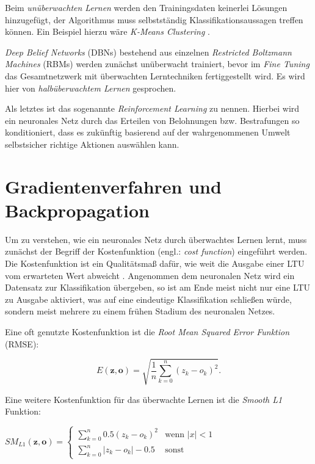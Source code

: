 Beim \textit{unüberwachten Lernen} werden den Trainingsdaten keinerlei Lösungen hinzugefügt, der Algorithmus muss selbstständig Klassifikationsaussagen treffen können. Ein Beispiel hierzu wäre \textit{K-Means Clustering} \cite{AurelienGeron.2018}. 

\textit{Deep Belief Networks} (DBNs) bestehend aus einzelnen \textit{Restricted Boltzmann Machines} (RBMs) werden zunächst unüberwacht trainiert, bevor im \textit{Fine Tuning} das Gesamtnetzwerk mit überwachten Lerntechniken fertiggestellt wird. Es wird hier von \textit{halbüberwachtem Lernen} gesprochen.

Als letztes ist das sogenannte \textit{Reinforcement Learning} zu nennen. Hierbei wird ein neuronales Netz durch das Erteilen von Belohnungen bzw. Bestrafungen so konditioniert, dass es zukünftig basierend auf der wahrgenommenen Umwelt selbstsicher richtige Aktionen auswählen kann.

\section*{Gradientenverfahren und Backpropagation}

Um zu verstehen, wie ein neuronales Netz durch überwachtes Lernen \glqq lernt\grqq{}, muss zunächst der Begriff der Kostenfunktion (engl.: \textit{cost function}) eingeführt werden. Die Kostenfunktion ist ein Qualitätsmaß dafür, wie weit die Ausgabe einer LTU vom erwarteten Wert abweicht \cite{AurelienGeron.2018}. Angenommen dem neuronalen Netz wird ein Datensatz zur Klassifikation übergeben, so ist am Ende meist nicht nur eine LTU zu Ausgabe aktiviert, was auf eine eindeutige Klassifikation schließen würde, sondern meist mehrere zu einem frühen Stadium des neuronalen Netzes.

Eine oft genutzte Kostenfunktion ist die \textit{Root Mean Squared Error Funktion} (RMSE):

\begin{equation} \label{mse}
E(\boldsymbol{z},\boldsymbol{o}) = \sqrt{\frac{1}{n}\sum_{k=0}^n (z_k-o_k)^2}.
\end{equation}

Eine weitere Kostenfunktion für das überwachte Lernen ist die \textit{Smooth L1} Funktion:

\begin{center}
$
SM_{L1}(\boldsymbol{z},\boldsymbol{o}) = \begin{cases}
\sum_{k=0}^n 0.5(z_k-o_k)^2      & \text{wenn } |x| < 1\\
\sum_{k=0}^n |z_k-o_k| - 0.5   & \text{sonst}
\end{cases}
$
\end{center}

